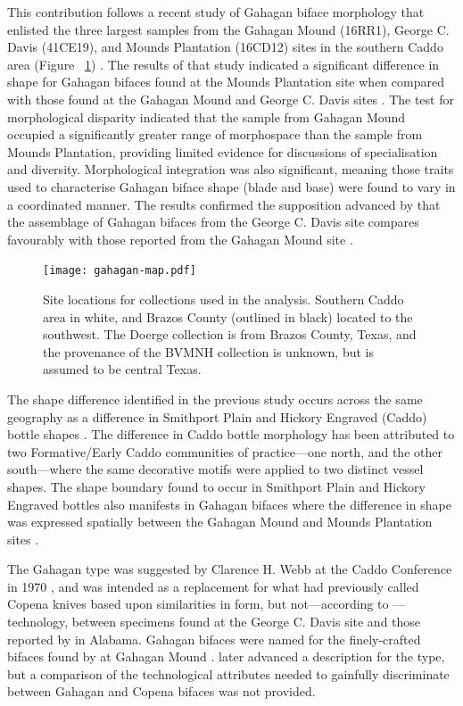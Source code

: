 \documentclass[review]{elsarticle}
\begin{document}
This contribution follows a recent study of Gahagan biface morphology that enlisted the three largest samples from the Gahagan Mound (16RR1), George C. Davis (41CE19), and Mounds Plantation (16CD12) sites in the southern Caddo area (Figure ~\ref{fig:figmap}) \citep{RN11783}. The results of that study indicated a significant difference in shape for Gahagan bifaces found at the Mounds Plantation site when compared with those found at the Gahagan Mound and George C. Davis sites \citep[Figure 7]{RN11783}. The test for morphological disparity indicated that the sample from Gahagan Mound occupied a significantly greater range of morphospace than the sample from Mounds Plantation, providing limited evidence for discussions of specialisation and diversity. Morphological integration was also significant, meaning those traits used to characterise Gahagan biface shape (blade and base) were found to vary in a coordinated manner. The results confirmed the supposition advanced by \cite{RN3684} that the assemblage of Gahagan bifaces from the George C. Davis site compares favourably with those reported from the Gahagan Mound site \citep{RN5274,RN2740}.

\begin{figure}[ht]\centering
\texttt{[image: gahagan-map.pdf]}
\caption{Site locations for collections used in the analysis. Southern Caddo area in white, and Brazos County (outlined in black) located to the southwest. The Doerge collection is from Brazos County, Texas, and the provenance of the BVMNH collection is unknown, but is assumed to be central Texas.}
\label{fig:figmap}
\end{figure}

The shape difference identified in the previous study occurs across the same geography as a difference in Smithport Plain and Hickory Engraved (Caddo) bottle shapes \citep{RN11801,RN11782,RN11716,RN20852}. The difference in Caddo bottle morphology has been attributed to two Formative/Early Caddo communities of practice---one north, and the other south---where the same decorative motifs were applied to two distinct vessel shapes. The shape boundary found to occur in Smithport Plain and Hickory Engraved bottles \citep[Figure 1]{RN20852} also manifests in Gahagan bifaces where the difference in shape was expressed spatially between the Gahagan Mound and Mounds Plantation sites \citep{RN11783}. 

The Gahagan type was suggested by Clarence H. Webb at the Caddo Conference in 1970 \citep{RN3684}, and was intended as a replacement for what \cite{RN800} had previously called Copena knives based upon similarities in form, but not---according to \cite{RN3684}---technology, between specimens found at the George C. Davis site and those reported by \cite{RN11562} in Alabama. Gahagan bifaces were named for the finely-crafted bifaces found by \cite{RN2740} at Gahagan Mound \citep{RN3684}. \citet[22]{RN4924} later advanced a description for the type, but a comparison of the technological attributes needed to gainfully discriminate between Gahagan and Copena bifaces was not provided. 
\end{document}
